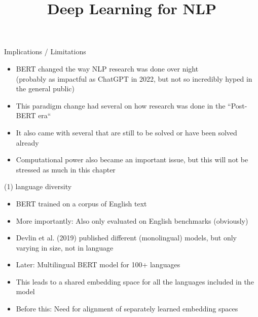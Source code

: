\documentclass[11pt,compress,t,notes=noshow, xcolor=table]{beamer}
\title{Deep Learning for NLP}
\begin{document}


\begin{frame}{Implications / Limitations}

\vfill

	\begin{itemize}
		\item BERT changed the way NLP research was done over night\\
					(probably as impactful as ChatGPT in 2022, but not so incredibly hyped in the general public)
		\item This paradigm change had several  on how research was done in the ``Post-BERT era``
		\item It also came with several  that are still to be solved or have been solved already
		\item Computational power also became an important issue, but this will not be stressed as much in this chapter
	\end{itemize}

\vfill

\end{frame}


\begin{frame}{(1) language diversity}

\vfill

	\begin{itemize}
		\item BERT trained on a corpus of English text
		\item More importantly: Also only evaluated on English benchmarks (obviously)
		\item Devlin et al. (2019) published different (monolingual) models, but only varying in size, not in language
		\item Later: Multilingual BERT model  for 100+ languages
		\item This leads to a shared embedding space for all the languages included in the model
		\item Before this: Need for alignment of separately learned embedding spaces
	\end{itemize}

\vfill

\end{frame}
\end{document}
